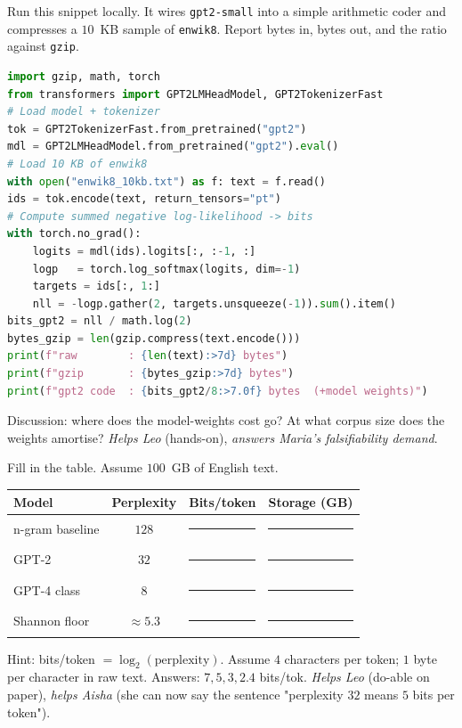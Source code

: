\begin{activity}[title={Activity 2 --- LLM as compressor (Python)}]
Run this snippet locally.  It wires \texttt{gpt2-small} into a
simple arithmetic coder and compresses a $10$~KB sample of
\texttt{enwik8}.  Report bytes in, bytes out, and the ratio
against \texttt{gzip}.
\begin{lstlisting}[language=Python]
import gzip, math, torch
from transformers import GPT2LMHeadModel, GPT2TokenizerFast
# Load model + tokenizer
tok = GPT2TokenizerFast.from_pretrained("gpt2")
mdl = GPT2LMHeadModel.from_pretrained("gpt2").eval()
# Load 10 KB of enwik8
with open("enwik8_10kb.txt") as f: text = f.read()
ids = tok.encode(text, return_tensors="pt")
# Compute summed negative log-likelihood -> bits
with torch.no_grad():
    logits = mdl(ids).logits[:, :-1, :]
    logp   = torch.log_softmax(logits, dim=-1)
    targets = ids[:, 1:]
    nll = -logp.gather(2, targets.unsqueeze(-1)).sum().item()
bits_gpt2 = nll / math.log(2)
bytes_gzip = len(gzip.compress(text.encode()))
print(f"raw        : {len(text):>7d} bytes")
print(f"gzip       : {bytes_gzip:>7d} bytes")
print(f"gpt2 code  : {bits_gpt2/8:>7.0f} bytes  (+model weights)")
\end{lstlisting}
Discussion: where does the model-weights cost go?  At what corpus
size does the weights amortise?  \emph{Helps Leo} (hands-on),
\emph{answers Maria's falsifiability demand}.
\end{activity}

\begin{activity}[title={Activity 3 --- Perplexity-to-bits worksheet}]
Fill in the table.  Assume $100$~GB of English text.
\medskip

\noindent
\begin{tabular}{lccc}
\hline
Model           & Perplexity & Bits/token & Storage (GB) \\
\hline
n-gram baseline & $128$      & \rule{1.5cm}{0.3pt} & \rule{1.5cm}{0.3pt} \\
GPT-2           & $32$       & \rule{1.5cm}{0.3pt} & \rule{1.5cm}{0.3pt} \\
GPT-4 class     & $8$        & \rule{1.5cm}{0.3pt} & \rule{1.5cm}{0.3pt} \\
Shannon floor   & $\approx 5.3$ & \rule{1.5cm}{0.3pt} & \rule{1.5cm}{0.3pt} \\
\hline
\end{tabular}

\medskip
Hint: bits/token $= \log_2(\text{perplexity})$.  Assume $4$
characters per token; $1$ byte per character in raw text.
Answers: $7, 5, 3, 2.4$ bits/tok.  \emph{Helps Leo}
(do-able on paper), \emph{helps Aisha} (she can now say the
sentence "perplexity $32$ means $5$ bits per token").
\end{activity}

